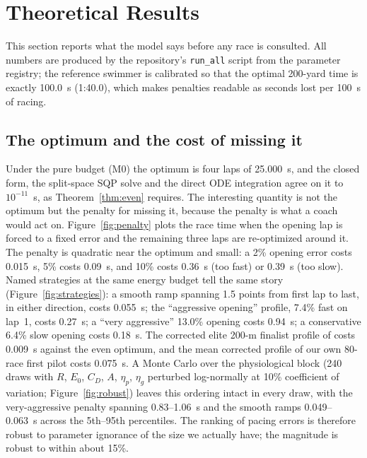 \section{Theoretical Results}\label{sec:results-theory}

This section reports what the model says before any race is consulted. All
numbers are produced by the repository's \texttt{run\_all} script from the
parameter registry; the reference swimmer is calibrated so that the optimal
200-yard time is exactly 100.0~s (1:40.0), which makes penalties readable as
seconds lost per 100~s of racing.

\subsection{The optimum and the cost of missing it}

Under the pure budget (M0) the optimum is four laps of 25.000~s, and the
closed form, the split-space SQP solve and the direct ODE integration agree
on it to $10^{-11}$~s, as Theorem~\ref{thm:even} requires. The interesting
quantity is not the optimum but the penalty for missing it, because the
penalty is what a coach would act on. Figure~\ref{fig:penalty} plots the
race time when the opening lap is forced to a fixed error and the remaining
three laps are re-optimized around it. The penalty is quadratic near the
optimum and small: a 2\% opening error costs 0.015~s, 5\% costs 0.09~s, and
10\% costs 0.36~s (too fast) or 0.39~s (too slow). Named strategies at the
same energy budget tell the same story (Figure~\ref{fig:strategies}): a
smooth ramp spanning 1.5 points from first lap to last, in either
direction, costs 0.055~s; the ``aggressive opening'' profile, 7.4\% fast on
lap~1, costs 0.27~s; a ``very aggressive'' 13.0\% opening costs 0.94~s; a
conservative 6.4\% slow opening costs 0.18~s. The corrected elite 200-m finalist profile of
\citet{robertson2009analysis} costs 0.009~s against the even optimum, and
the mean corrected profile of our own 80-race first pilot costs 0.075~s. A
Monte Carlo over the physiological block (240 draws with $R$, $E_0$, $C_D$,
$A$, $\eta_p$, $\eta_g$ perturbed log-normally at 10\% coefficient of
variation; Figure~\ref{fig:robust}) leaves this ordering intact in every
draw, with the very-aggressive penalty spanning 0.83--1.06~s and the smooth
ramps 0.049--0.063~s across the 5th--95th percentiles. The ranking of
pacing errors is therefore robust to parameter ignorance of the size we
actually have; the magnitude is robust to within about 15\%.

